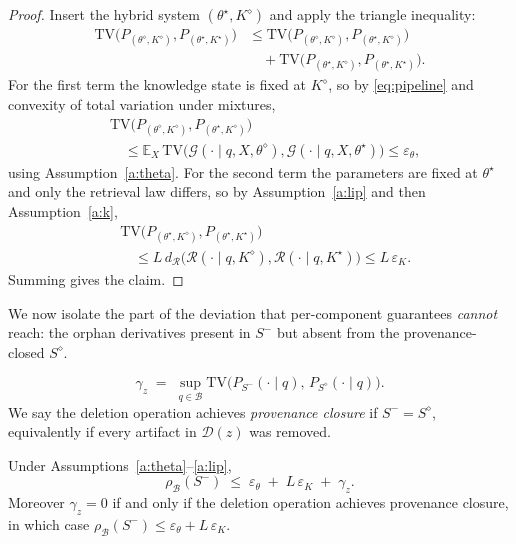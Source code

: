 \begin{proof}
Insert the hybrid system $(\theta^{\star},K^{\diamond})$ and apply the
triangle inequality:
\[
\begin{aligned}
\mathrm{TV}\!\big(P_{(\theta^{\diamond},K^{\diamond})},P_{(\theta^{\star},K^{\star})}\big)
&\le
\mathrm{TV}\!\big(P_{(\theta^{\diamond},K^{\diamond})},P_{(\theta^{\star},K^{\diamond})}\big)\\
&\quad+
\mathrm{TV}\!\big(P_{(\theta^{\star},K^{\diamond})},P_{(\theta^{\star},K^{\star})}\big).
\end{aligned}
\]
For the first term the knowledge state is fixed at $K^{\diamond}$, so by
\eqref{eq:pipeline} and convexity of total variation under mixtures,
\[
\begin{aligned}
&\mathrm{TV}\!\big(P_{(\theta^{\diamond},K^{\diamond})},
P_{(\theta^{\star},K^{\diamond})}\big)\\
&\quad\le
\mathbb{E}_{X}\,
\mathrm{TV}\!\big(\mathcal{G}(\cdot\mid q,X,\theta^{\diamond}),
\mathcal{G}(\cdot\mid q,X,\theta^{\star})\big)
\le \varepsilon_{\theta},
\end{aligned}
\]
using Assumption~\ref{a:theta}. For the second term the parameters are
fixed at $\theta^{\star}$ and only the retrieval law differs, so by
Assumption~\ref{a:lip} and then Assumption~\ref{a:k},
\[
\begin{aligned}
&\mathrm{TV}\!\big(P_{(\theta^{\star},K^{\diamond})},
P_{(\theta^{\star},K^{\star})}\big)\\
&\quad\le L\,d_{\mathcal{R}}\!\big(
\mathcal{R}(\cdot\mid q,K^{\diamond}),
\mathcal{R}(\cdot\mid q,K^{\star})\big)
\le L\,\varepsilon_{K}.
\end{aligned}
\]
Summing gives the claim.
\end{proof}

We now isolate the part of the deviation that per-component guarantees
\emph{cannot} reach: the orphan derivatives present in $S^{-}$ but absent
from the provenance-closed $S^{\diamond}$.

\begin{definition}
\label{def:gamma}
\[
 \gamma_{z}
 \;=\;
 \sup_{q\in\mathcal{B}}
 \mathrm{TV}\!\big(P_{S^{-}}(\cdot\mid q),\,P_{S^{\diamond}}(\cdot\mid q)\big).
\]
We say the deletion operation achieves \emph{provenance closure} if
$S^{-}=S^{\diamond}$, equivalently if every artifact in
$\mathcal{D}(z)$ was removed.
\end{definition}

\begin{theorem}
\label{thm:main}
Under Assumptions~\ref{a:theta}--\ref{a:lip},
\[
 \boxed{\;\rho_{\mathcal{B}}(S^{-})
 \;\le\;
 \varepsilon_{\theta}\;+\;L\,\varepsilon_{K}\;+\;\gamma_{z}.\;}
\]
Moreover $\gamma_{z}=0$ if and only if the deletion operation achieves
provenance closure, in which case
$\rho_{\mathcal{B}}(S^{-})\le\varepsilon_{\theta}+L\,\varepsilon_{K}$.
\end{theorem}

